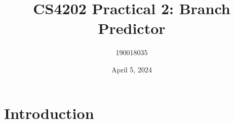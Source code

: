 \documentclass[12pt]{article}
\title{CS4202 Practical 2: Branch Predictor}
\author{190018035}
\date{April 5, 2024}
\begin{document}
\maketitle

\tableofcontents

\section{Introduction}

\printbibliography
\end{document}
